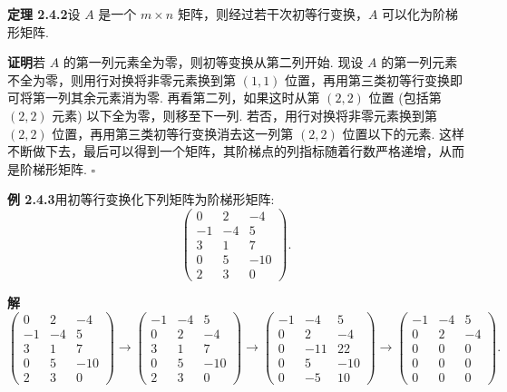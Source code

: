 \documentclass[UTF8, 12pt, fontset=fandol, oneside]{ctexart}
\begin{document}
\noindent\textbf{定理 2.4.2}\quad 设 $A$ 是一个 $m\times n$ 矩阵，则经过若干次初等行变换，$A$ 可以化为阶梯形矩阵.

\noindent\textbf{证明}\quad 若 $A$ 的第一列元素全为零，则初等变换从第二列开始. 现设 $A$ 的第一列元素不全为零，则用行对换将非零元素换到第 $(1,1)$ 位置，再用第三类初等行变换即可将第一列其余元素消为零. 再看第二列，如果这时从第 $(2,2)$ 位置 (包括第 $(2,2)$ 元素) 以下全为零，则移至下一列. 若否，用行对换将非零元素换到第 $(2,2)$ 位置，再用第三类初等行变换消去这一列第 $(2,2)$ 位置以下的元素. 这样不断做下去，最后可以得到一个矩阵，其阶梯点的列指标随着行数严格递增，从而是阶梯形矩阵. $\square$

\noindent\textbf{例 2.4.3}\quad 用初等行变换化下列矩阵为阶梯形矩阵:
\[
\left(\begin{array}{ccc}
0 & 2 & -4\\
-1 & -4 & 5\\
3 & 1 & 7\\
0 & 5 & -10\\
2 & 3 & 0
\end{array}\right).
\]

\noindent\textbf{解}\quad
\[
\left(\begin{array}{ccc}
0 & 2 & -4\\
-1 & -4 & 5\\
3 & 1 & 7\\
0 & 5 & -10\\
2 & 3 & 0
\end{array}\right)
\longrightarrow
\left(\begin{array}{ccc}
-1 & -4 & 5\\
0 & 2 & -4\\
3 & 1 & 7\\
0 & 5 & -10\\
2 & 3 & 0
\end{array}\right)
\longrightarrow
\left(\begin{array}{ccc}
-1 & -4 & 5\\
0 & 2 & -4\\
0 & -11 & 22\\
0 & 5 & -10\\
0 & -5 & 10
\end{array}\right)
\longrightarrow
\left(\begin{array}{ccc}
-1 & -4 & 5\\
0 & 2 & -4\\
0 & 0 & 0\\
0 & 0 & 0\\
0 & 0 & 0
\end{array}\right).
\]
\end{document}
